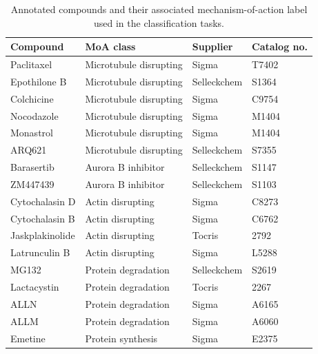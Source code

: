 \documentclass[a4paper,11pt,twoside,openright]{scrbook}
\begin{document}
\begin{table}[]
    \begin{footnotesize}
    \centering
    \captionsetup{width=0.8\textwidth}
    \caption[Annotated compounds of known MoA]{Annotated compounds and their associated mechanism-of-action label used in the classification tasks.}
    \label{table:compounds}
    \begin{tabular}{@{}llll@{}}
    \toprule
    Compound        & MoA class              & Supplier    & Catalog no. \\ \midrule
    Paclitaxel      & Microtubule disrupting & Sigma       & T7402       \\
    Epothilone B    & Microtubule disrupting & Selleckchem & S1364       \\
    Colchicine      & Microtubule disrupting & Sigma       & C9754       \\
    Nocodazole      & Microtubule disrupting & Sigma       & M1404       \\
    Monastrol       & Microtubule disrupting & Sigma       & M1404       \\
    ARQ621          & Microtubule disrupting & Selleckchem & S7355       \\
    Barasertib      & Aurora B inhibitor     & Selleckchem & S1147       \\
    ZM447439        & Aurora B inhibitor     & Selleckchem & S1103       \\
    Cytochalasin D  & Actin disrupting       & Sigma       & C8273       \\
    Cytochalasin B  & Actin disrupting       & Sigma       & C6762       \\
    Jaskplakinolide & Actin disrupting       & Tocris      & 2792        \\
    Latrunculin B   & Actin disrupting       & Sigma       & L5288       \\
    MG132           & Protein degradation    & Selleckchem & S2619       \\
    Lactacystin     & Protein degradation    & Tocris      & 2267        \\
    ALLN            & Protein degradation    & Sigma       & A6165       \\
    ALLM            & Protein degradation    & Sigma       & A6060       \\
    Emetine         & Protein synthesis      & Sigma       & E2375       \\

\end{tabular}
\end{footnotesize}
\end{table}
\end{document}
